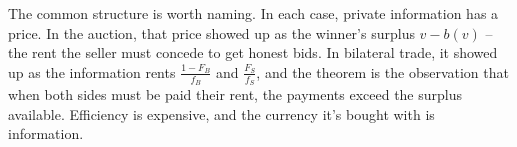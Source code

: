 \documentclass[12pt]{article}
\theoremstyle{definition}
\theoremstyle{remark}
\theoremstyle{plain}                          %
\begin{document}
The common structure is worth naming. In each case, private information has a price. In the auction, that price showed up as the winner's surplus $v - b(v)$ -- the rent the seller must concede to get honest bids. In bilateral trade, it showed up as the information rents $\tfrac{1-F_B}{f_B}$ and $\tfrac{F_S}{f_S}$, and the theorem is the observation that when both sides must be paid their rent, the payments exceed the surplus available. Efficiency is expensive, and the currency it's bought with is information.
 
\end{document}
